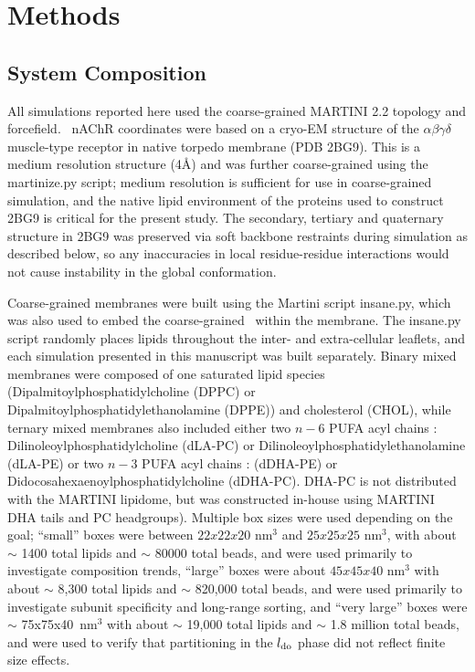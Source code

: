 \section{Methods}
\label{S:2}

\subsection{System Composition}

All simulations reported here used the coarse-grained MARTINI 2.2\citep{martini} topology and forcefield.
~nAChR coordinates were based on a cryo-EM structure of the $\alpha{\beta}\gamma\delta$ muscle-type receptor in native torpedo membrane (PDB 2BG9\citep{Unwin2005}). This is a medium resolution structure (4\AA) and was further coarse-grained using the martinize.py script; medium resolution is sufficient for use in coarse-grained simulation, and the native lipid environment of the proteins used to construct 2BG9 is critical for the present study. The secondary, tertiary and quaternary structure in 2BG9 was preserved via soft backbone restraints during simulation as described below, so any inaccuracies in local residue-residue interactions would not cause instability in the global conformation.  

Coarse-grained membranes were built using the Martini script insane.py, which was also used to embed the coarse-grained \nachr~within the membrane. The insane.py script randomly places lipids throughout the inter- and extra-cellular leaflets, and each simulation presented in this manuscript was built separately.  Binary mixed membranes were composed of one saturated lipid species (Dipalmitoylphosphatidylcholine (DPPC) or Dipalmitoylphosphatidylethanolamine (DPPE)) and cholesterol (CHOL), while ternary mixed membranes also included either two $n-6$ PUFA acyl chains : Dilinoleoylphosphatidylcholine (dLA-PC) or Dilinoleoylphosphatidylethanolamine (dLA-PE) or two $n-3$ PUFA acyl chains :  (dDHA-PE) or Didocosahexaenoylphosphatidylcholine (dDHA-PC). DHA-PC is not distributed with the MARTINI lipidome, but was constructed in-house using MARTINI DHA tails and PC headgroups). Multiple box sizes were used depending on the goal;  ``small'' boxes were between $22x22x20$ nm$^3$ and $25x25x25$ nm$^3$, with about {$\sim$ 1400} total lipids and {$\sim$ 80000} total beads, and were used primarily to investigate composition trends, ``large'' boxes were about $45x45x40$ nm$^3$ with about {$\sim$ 8,300} total lipids and {$\sim$ 820,000} total beads, and were used primarily to investigate subunit specificity and long-range sorting, and ``very large'' boxes were $\sim$ 75x75x40~nm$^3$ with about {$\sim$ 19,000} total lipids and {$\sim$ 1.8 million} total beads, and were used to verify that partitioning in the $l_{\mathrm{do}}$ phase did not reflect finite size effects.  


